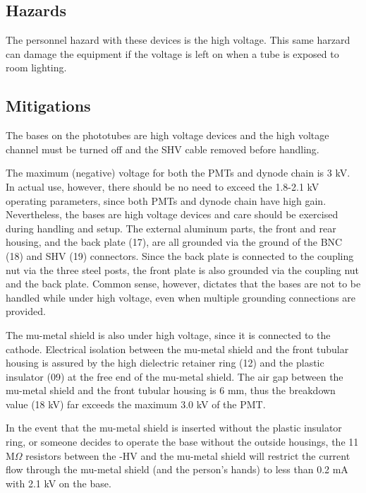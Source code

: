 \begin{safetyen}{0}{0}
\subsection{Hazards}

The personnel hazard with these devices is the high voltage.   This same harzard can
damage the equipment if the voltage is left on when a tube is exposed to room lighting.

\subsection{Mitigations}

  The bases on the phototubes are high voltage devices and the high voltage channel must be
  turned off and the SHV cable removed before handling.
  
  The maximum (negative) voltage for both the PMTs and dynode chain is 3 kV. In actual 
  use, however, there should be no need to exceed the 1.8-2.1 kV operating 
  parameters, since both PMTs and dynode chain have high gain. Nevertheless, the 
  bases are high voltage devices and care should be exercised during handling and 
  setup. The external aluminum parts, the front and rear housing, and the back 
  plate (17), are all grounded via the ground of the BNC (18) and SHV (19) 
  connectors. Since the back plate is connected to the coupling nut via the three 
  steel posts, the front plate is also grounded via the coupling nut and the back 
  plate. Common sense, however, dictates that the bases are not to be handled     
  while under high voltage, even when multiple grounding connections are provided.
  
  The mu-metal shield is also under high voltage, since it is connected to the 
  cathode. Electrical isolation between the mu-metal shield and the front 
  tubular housing is assured by the high dielectric retainer ring (12) and the 
  plastic insulator (09) at the free end of the mu-metal shield. The air gap 
  between the mu-metal shield and the front tubular housing is 6 mm, thus the 
  breakdown value (18 kV) far exceeds the maximum 3.0 kV of the PMT.
  
  In the event that the mu-metal shield is inserted without the plastic insulator 
  ring, or someone decides to operate the base without the outside housings, the 
  11 M$\Omega$ resistors between the -HV and the mu-metal shield will restrict the 
  current flow through the mu-metal shield (and the person's hands) to less than 0.2 
  mA with 2.1 kV on the base. 


\end{safetyen}
